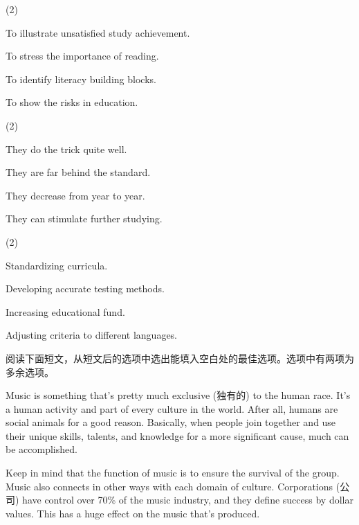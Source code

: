 \documentclass{英语试卷}
\begin{document}
\begin{choices}(2)
  \item To illustrate unsatisfied study achievement.
  \item To stress the importance of reading.
  \item To identify literacy building blocks.
  \item To show the risks in education.
\end{choices}
\begin{choices}(2)
  \item They do the trick quite well.
  \item They are far behind the standard.
  \item They decrease from year to year.
  \item They can stimulate further studying.
\end{choices}
\begin{choices}(2)
  \item Standardizing curricula.
  \item Developing accurate testing methods.
  \item Increasing educational fund.
  \item Adjusting criteria to different languages.
\end{choices}
\par 阅读下面短文，从短文后的选项中选出能填入空白处的最佳选项。选项中有两项为多余选项。\par
\par Music is something that's pretty much exclusive (独有的) to the human race. It's a human activity and part of every culture in the world. After all, humans are social animals for a good reason.  Basically, when people join together and use their unique skills, talents, and knowledge for a more significant cause, much can be accomplished.\par
\par Keep in mind that the function of music is to ensure the survival of the group. Music also connects in other ways with each domain of culture.  Corporations (公司) have control over 70\% of the music industry, and they define success by dollar values. This has a huge effect on the music that's produced.\par
\end{document}
